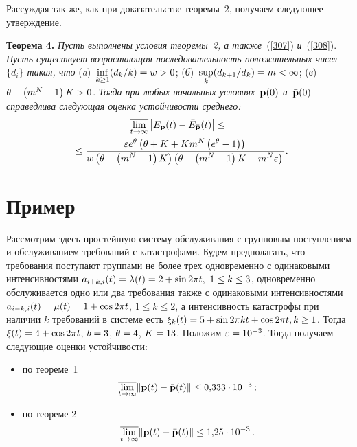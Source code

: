 \begin{multicols}{2}
\bigskip

Рассуждая так же, как при доказательстве теоремы~2, получаем следующее утверждение.

\bigskip

\noindent
\textbf{Теорема 4.} \textit{Пусть выполнены условия теоремы~2, а также}~(\ref{307}) 
\textit{и}~(\ref{308}). 
\textit{Пусть существует возрастающая последовательность положительных чисел~$\{d_i\}$ такая, 
что} (\textit{a})~$\inf\limits_{k \ge 1}({d_k}/{k})=w\hm>0$; 
(\textit{б})~$\sup\limits_{k}({d_{k+1}}/{d_k})\hm =m \hm< \infty$;
(\textit{в})~$\theta \hm- \left(m^N-1\right)K \hm>0$.  
\textit{Тогда при любых начальных условиях~${\bf p}(0)$ и~$\bar{\bf p}(0)$ справедлива сле\-ду\-ющая 
оценка устойчивости среднего:}
\begin{multline*}
\overline{\lim_{t \to \infty}} \left|E_{\bf p}(t)- \bar{E}_{\bf \bar{p}}(t)\right| \le{}\\
{}\le  \displaystyle\frac{\displaystyle \varepsilon e^{\theta}\left(\theta + K + Km^N\left(e^{\theta}-1\right)\right)\mathstrut}{\displaystyle w\left(\theta - \left(m^N-1\right)K\right)\left(\theta - 
\left(m^N-1\right)K- m^N\varepsilon\right)\mathstrut}.\hspace*{-2.9923pt}
\end{multline*}


\section{Пример}

Рассмотрим здесь простейшую систему обслуживания с групповым поступлением  и 
обслуживанием требований с катастрофами. Будем предполагать, что требования 
поступают группами не более трех одновременно с одинаковыми интенсивностями 
$a_{i+k,i}(t) \hm= \lambda(t) \hm= 2 \hm+ \sin 2\pi t, \ 1 \hm\le k \hm\le 3$, 
одновременно обслуживается одно или два требования также с одинаковыми интенсивностями  
$a_{i-k,i}(t)\hm = \mu (t) \hm= 1 + \cos 2\pi t$, $1 \le k \le 2$, 
а интенсивность катастрофы при наличии $k$ требований в системе есть 
$\xi_k(t)\hm=5 \hm+ \sin 2 \pi k t \hm+ \cos 2 \pi t, k \ge 1$.  Тогда 
$\xi (t)\hm=4 \hm+ \cos 2 \pi t$, $b\hm=3$, $\theta\hm=4$, $K\hm=13$. Положим 
$\varepsilon\hm=10^{-3}$. Тогда получаем следующие оценки устойчивости:
\begin{itemize}
\item по теореме~1
\begin{equation*}
\overline{\lim\limits_{t \to \infty}}  \| {\bf p}(t)-\bar{{\bf p}}(t)\| \le 0{,}333\cdot 10^{-3}\,;
\end{equation*}
\item
по теореме 2
\begin{equation*}
\overline{\lim\limits_{t \to \infty}}  \| {\bf p}(t)-\bar{{\bf p}}(t)\| \le 1{,}25 \cdot 10^{-3}\,.
\end{equation*}
\end{itemize}


\end{multicols}
